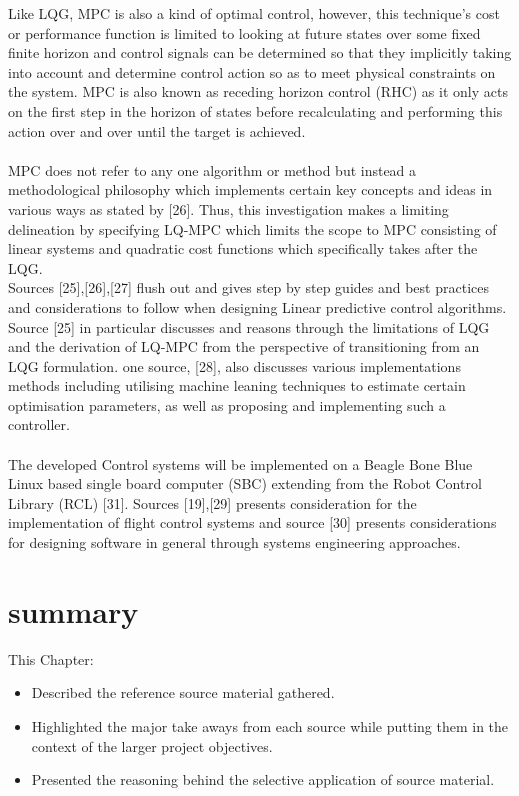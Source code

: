 \documentclass[12pt,a4paper,twoside]{report}
\begin{document}
				Like LQG, MPC is also a kind of optimal control, however, this technique’s cost or performance function is limited to looking at future states over some fixed finite horizon and control signals can be determined so that they implicitly taking into account and determine control action so as to meet physical constraints on the system. MPC is also known as receding horizon control (RHC) as it only acts on the first step in the horizon of states before recalculating and performing this action over and over until the target is achieved.
				\\ \\
				MPC does not refer to any one algorithm or method but instead a methodological philosophy which implements certain key concepts and ideas in various ways as stated by [26]. Thus, this investigation makes a limiting delineation by specifying LQ-MPC which limits the scope to MPC consisting of linear systems and quadratic cost functions which specifically takes after the LQG.
				\\
				Sources [25],[26],[27] flush out and gives step by step guides and best practices and considerations to follow when designing Linear predictive control algorithms. Source [25] in particular discusses and reasons through the limitations of LQG and the derivation of LQ-MPC from the perspective of transitioning from an LQG formulation. one source, [28], also discusses various implementations methods including utilising machine leaning techniques to estimate certain optimisation parameters, as well as proposing and implementing such a controller.
				\\ \\
				The developed Control systems will be implemented on a Beagle Bone Blue Linux based single board computer (SBC) extending from the Robot Control Library (RCL) [31]. Sources [19],[29] presents consideration for the implementation of flight control systems and source [30] presents considerations for designing software in general through systems engineering approaches.
			
			\section{summary}	
			
				This Chapter:
				\\
				\begin{itemize}
					\item 
						Described the reference source material gathered.
					\item 
						Highlighted the major take aways from each source while putting them in the context of the larger project objectives.
					\item
						Presented the reasoning behind the selective application of source material.
				\end{itemize}
		
\end{document}
